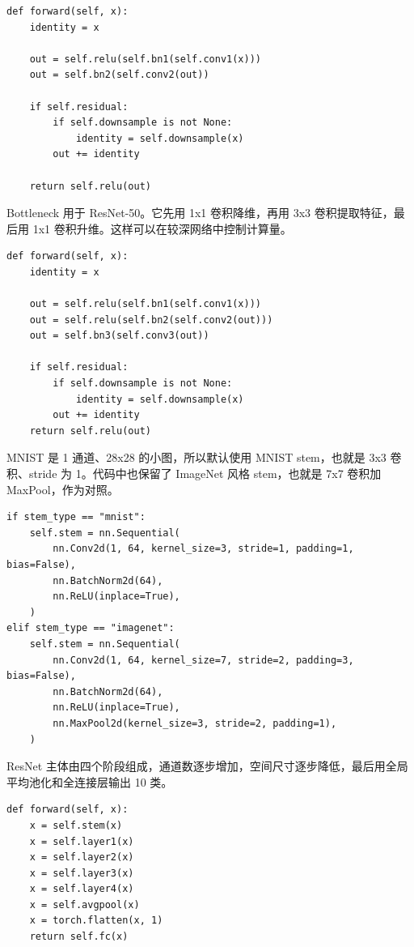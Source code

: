 \documentclass[UTF8]{ctexart}
\begin{document}
\begin{lstlisting}[caption={实验三：BasicBlock 残差结构}]
def forward(self, x):
    identity = x

    out = self.relu(self.bn1(self.conv1(x)))
    out = self.bn2(self.conv2(out))

    if self.residual:
        if self.downsample is not None:
            identity = self.downsample(x)
        out += identity

    return self.relu(out)
\end{lstlisting}

Bottleneck 用于 ResNet-50。它先用 1x1 卷积降维，再用 3x3 卷积提取特征，最后用 1x1 卷积升维。这样可以在较深网络中控制计算量。

\begin{lstlisting}[caption={实验三：Bottleneck 残差结构}]
def forward(self, x):
    identity = x

    out = self.relu(self.bn1(self.conv1(x)))
    out = self.relu(self.bn2(self.conv2(out)))
    out = self.bn3(self.conv3(out))

    if self.residual:
        if self.downsample is not None:
            identity = self.downsample(x)
        out += identity
    return self.relu(out)
\end{lstlisting}

MNIST 是 1 通道、28x28 的小图，所以默认使用 MNIST stem，也就是 3x3 卷积、stride 为 1。代码中也保留了 ImageNet 风格 stem，也就是 7x7 卷积加 MaxPool，作为对照。

\begin{lstlisting}[caption={实验三：MNIST stem 与 ImageNet stem}]
if stem_type == "mnist":
    self.stem = nn.Sequential(
        nn.Conv2d(1, 64, kernel_size=3, stride=1, padding=1, bias=False),
        nn.BatchNorm2d(64),
        nn.ReLU(inplace=True),
    )
elif stem_type == "imagenet":
    self.stem = nn.Sequential(
        nn.Conv2d(1, 64, kernel_size=7, stride=2, padding=3, bias=False),
        nn.BatchNorm2d(64),
        nn.ReLU(inplace=True),
        nn.MaxPool2d(kernel_size=3, stride=2, padding=1),
    )
\end{lstlisting}

ResNet 主体由四个阶段组成，通道数逐步增加，空间尺寸逐步降低，最后用全局平均池化和全连接层输出 10 类。

\begin{lstlisting}[caption={实验三：ResNet 整体前向传播}]
def forward(self, x):
    x = self.stem(x)
    x = self.layer1(x)
    x = self.layer2(x)
    x = self.layer3(x)
    x = self.layer4(x)
    x = self.avgpool(x)
    x = torch.flatten(x, 1)
    return self.fc(x)
\end{lstlisting}
\end{document}

